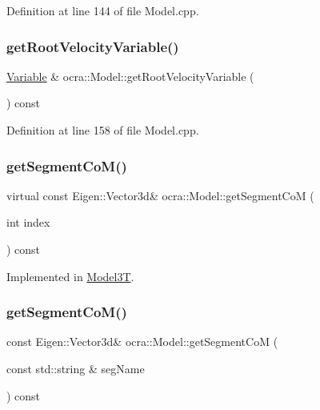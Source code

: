 Definition at line 144 of file Model.\+cpp.

\hypertarget{classocra_1_1Model_a556fa391a6c5405599d23ee83d4b4787}{}\label{classocra_1_1Model_a556fa391a6c5405599d23ee83d4b4787} 
\subsubsection{\texorpdfstring{get\+Root\+Velocity\+Variable()}{getRootVelocityVariable()}}
{\footnotesize\ttfamily \hyperlink{classocra_1_1Variable}{Variable} \& ocra\+::\+Model\+::get\+Root\+Velocity\+Variable (\begin{DoxyParamCaption}{ }\end{DoxyParamCaption}) const}



Definition at line 158 of file Model.\+cpp.

\hypertarget{classocra_1_1Model_a577292e1e1441afbecb3912124b7eb04}{}\label{classocra_1_1Model_a577292e1e1441afbecb3912124b7eb04} 
\subsubsection{\texorpdfstring{get\+Segment\+Co\+M()}{getSegmentCoM()}\hspace{0.1cm}{\footnotesize\ttfamily [1/2]}}
{\footnotesize\ttfamily virtual const Eigen\+::\+Vector3d\& ocra\+::\+Model\+::get\+Segment\+CoM (\begin{DoxyParamCaption}\item[{int}]{index }\end{DoxyParamCaption}) const\hspace{0.3cm}{\ttfamily [pure virtual]}}



Implemented in \hyperlink{classModel3T_a7e3f88de763eb1faf3ba60dc032a99fb}{Model3T}.

\hypertarget{classocra_1_1Model_abfe64304c5b42b875f5b3df252d82619}{}\label{classocra_1_1Model_abfe64304c5b42b875f5b3df252d82619} 
\subsubsection{\texorpdfstring{get\+Segment\+Co\+M()}{getSegmentCoM()}\hspace{0.1cm}{\footnotesize\ttfamily [2/2]}}
{\footnotesize\ttfamily const Eigen\+::\+Vector3d\& ocra\+::\+Model\+::get\+Segment\+CoM (\begin{DoxyParamCaption}\item[{const std\+::string \&}]{seg\+Name }\end{DoxyParamCaption}) const\hspace{0.3cm}{\ttfamily [inline]}}



